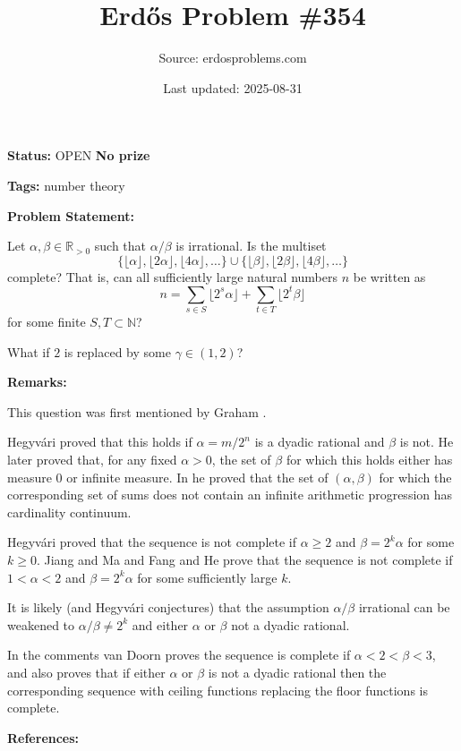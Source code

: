 \documentclass{article}
\title{Erd\H{o}s Problem \#354}
\date{Last updated: 2025-08-31}
\author{Source: erdosproblems.com}
\begin{document}
\maketitle

\noindent\textbf{Status:} OPEN \quad \textbf{No prize}

\noindent\textbf{Tags:} number theory

\medskip
\noindent\textbf{Problem Statement:}

Let $\alpha,\beta\in \mathbb{R}_{>0}$ such that $\alpha/\beta$ is irrational. Is the multiset\[\{ \lfloor \alpha\rfloor,\lfloor 2\alpha\rfloor,\lfloor 4\alpha\rfloor,\ldots\}\cup \{ \lfloor \beta\rfloor,\lfloor 2\beta\rfloor,\lfloor 4\beta\rfloor,\ldots\}\]complete? That is, can all sufficiently large natural numbers $n$ be written as\[n=\sum_{s\in S}\lfloor 2^s\alpha\rfloor+\sum_{t\in T}\lfloor 2^t\beta\rfloor\]for some finite $S,T\subset \mathbb{N}$?

What if $2$ is replaced by some $\gamma\in(1,2)$?

\bigskip
\noindent\textbf{Remarks:}

This question was first mentioned by Graham \cite{Gr71}. 

Hegyv\'{a}ri \cite{He89} proved that this holds if $\alpha=m/2^n$ is a dyadic rational and $\beta$ is not. He later \cite{He91} proved that, for any fixed $\alpha>0$, the set of $\beta$ for which this holds either has measure $0$ or infinite measure. In \cite{He94} he proved that the set of $(\alpha,\beta)$ for which the corresponding set of sums does not contain an infinite arithmetic progression has cardinality continuum.

Hegyv\'{a}ri \cite{He89} proved that the sequence is not complete if $\alpha\geq 2$ and $\beta =2^k\alpha$ for some $k\geq 0$. Jiang and Ma \cite{JiMa24} and Fang and He \cite{FaHe25} prove that the sequence is not complete if $1<\alpha<2$ and $\beta=2^k\alpha$ for some sufficiently large $k$.

It is likely (and Hegyv\'{a}ri conjectures) that the assumption $\alpha/\beta$ irrational can be weakened to $\alpha/\beta \neq 2^k$ and either $\alpha$ or $\beta$ not a dyadic rational.

In the comments van Doorn proves the sequence is complete if $\alpha < 2<\beta<3$, and also proves that if either $\alpha$ or $\beta$ is not a dyadic rational then the corresponding sequence with ceiling functions replacing the floor functions is complete.

\bigskip
\noindent\textbf{References:}
\end{document}
